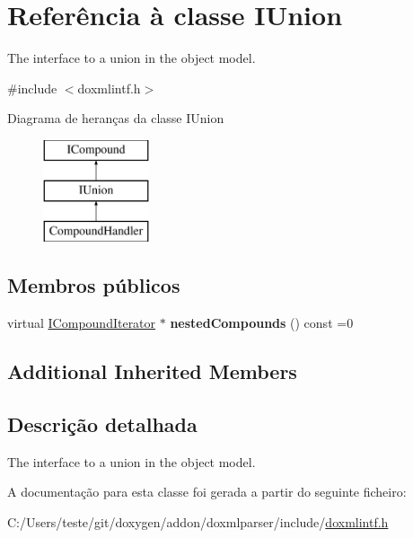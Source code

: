 \hypertarget{class_i_union}{\section{Referência à classe I\-Union}
\label{class_i_union}
}


The interface to a union in the object model.  




{\ttfamily \#include $<$doxmlintf.\-h$>$}

Diagrama de heranças da classe I\-Union\begin{figure}[H]
\begin{center}
\leavevmode
\includegraphics[height=3.000000cm]{class_i_union}
\end{center}
\end{figure}
\subsection*{Membros públicos}
\begin{DoxyCompactItemize}
\item 
\hypertarget{class_i_union_a6a1aab20f15a204af0b8d3e8470817bd}{virtual \hyperlink{class_i_compound_iterator}{I\-Compound\-Iterator} $\ast$ {\bfseries nested\-Compounds} () const =0}\label{class_i_union_a6a1aab20f15a204af0b8d3e8470817bd}

\end{DoxyCompactItemize}
\subsection*{Additional Inherited Members}


\subsection{Descrição detalhada}
The interface to a union in the object model. 

A documentação para esta classe foi gerada a partir do seguinte ficheiro\-:\begin{DoxyCompactItemize}
\item 
C\-:/\-Users/teste/git/doxygen/addon/doxmlparser/include/\hyperlink{include_2doxmlintf_8h}{doxmlintf.\-h}\end{DoxyCompactItemize}

